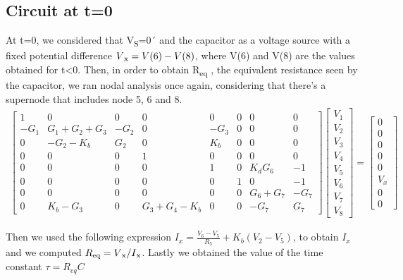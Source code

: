 \subsection{Circuit at t=0}
At t=0, we considered that V\textsubscript{S}=0´ and the capacitor as a voltage source with a fixed potential difference $V\textsubscript{x} = V(6)-V(8)$, where V(6) and V(8) are the values obtained for t<0. Then, in order to obtain R\textsubscript{eq} , the equivalent resistance seen by the capacitor,  we ran nodal analysis once again, considering that there's a supernode that includes node 5, 6 and 8.
\begin{gather}
\begin{bmatrix}
1    & 0           & 0    & 0           & 0 & 0 & 0 & 0\\
-G_1 & G_1+G_2+G_3 & -G_2 & 0           & -G_3 & 0 & 0 & 0\\
0    & -G_2-K_b    & G_2  & 0           & K_b & 0 & 0 & 0\\
0    & 0           & 0    & 1           & 0 & 0 & 0 & 0\\
0    & 0           & 0    & 0           & 1 & 0 & K_d G_6 & -1\\
0    & 0           & 0    & 0           & 0 & 1 & 0 & -1\\
0    & 0           & 0    & 0           & 0 & 0 & G_6+G_7 & -G_7\\
0    & K_b-G_3     & 0    & G_3+G_4-K_b & 0 & 0 & -G_7 & G_7
\end{bmatrix}
\begin{bmatrix}
 V_1\\
 V_2\\
 V_3\\
 V_4\\
 V_5\\
 V_6\\
 V_7\\
 V_8
\end{bmatrix}
=
\begin{bmatrix}
 0\\
 0\\
 0\\
 0\\
 0\\
 V_x\\
 0\\
 0
\end{bmatrix}
\end{gather}


Then we used the following expression $I_x = \frac{V_6-V_5}{R_5} + K_b(V_2 - V_5)$, to obtain $I_x$ and we computed $R\textsubscript{eq} = V\textsubscript{x} / I\textsubscript{x}$. Lastly we obtained the value of the time constant $\tau=R_{eq}C$


